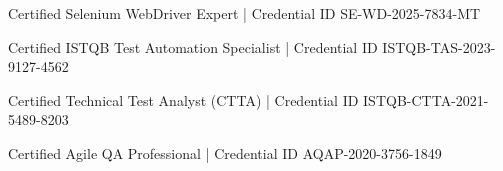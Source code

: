\vspace{1em}
\begin{scholarship}
	{Certified Selenium WebDriver Expert | 
	Credential ID SE-WD-2025-7834-MT}

	{Certified ISTQB Test Automation Specialist | 
	Credential ID ISTQB-TAS-2023-9127-4562}

	{Certified Technical Test Analyst (CTTA) | 
	Credential ID ISTQB-CTTA-2021-5489-8203}

	{Certified Agile QA Professional | 
	Credential ID AQAP-2020-3756-1849}
\end{scholarship}
\vspace{1em}